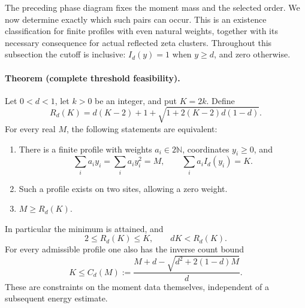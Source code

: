 The preceding phase diagram fixes the moment mass and the selected order.
We now determine exactly which such pairs can occur.  This is an existence
classification for finite profiles with even natural weights, together with
its necessary consequence for actual reflected zeta clusters.
Throughout this subsection the cutoff is inclusive:
\(I_d(y)=1\) when \(y\ge d\), and zero otherwise.

\paragraph{Theorem (complete threshold feasibility).}
Let \(0<d<1\), let \(k>0\) be an integer, and put \(K=2k\).  Define
\begin{equation}
 R_d(K)=d(K-2)+1+\sqrt{1+2(K-2)d(1-d)}.
 \label{eq:threshold-minimum-mass}
\end{equation}
For every real \(M\), the following statements are equivalent:
\begin{enumerate}
\item There is a finite profile with weights \(a_i\in2\mathbb N\),
coordinates \(y_i\ge0\), and
\[
 \sum_i a_i y_i=\sum_i a_i y_i^2=M,
 \qquad \sum_i a_i I_d(y_i)=K.
\]
\item Such a profile exists on two sites, allowing a zero weight.
\item \(M\ge R_d(K)\).
\end{enumerate}
In particular the minimum is attained, and
\[
 2\le R_d(K)\le K,\qquad dK<R_d(K).
\]
For every admissible profile one also has the inverse count bound
\begin{equation}
 K\le C_d(M):=
 \frac{M+d-\sqrt{d^2+2(1-d)M}}d.
 \label{eq:threshold-inverse-count}
\end{equation}
These are constraints on the moment data themselves, independent of a
subsequent energy estimate.

